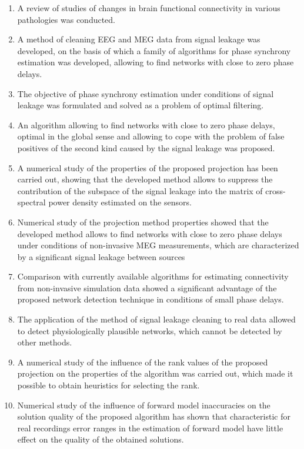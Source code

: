 \begin{enumerate}
  \item A review of studies of changes in brain functional connectivity in various pathologies was conducted.
  \item A method of cleaning EEG and MEG data from signal leakage was developed, on the basis of which a family of algorithms for phase synchrony estimation was developed, allowing to find networks with close to zero phase delays.
  \item The objective of phase synchrony estimation under conditions of signal leakage was formulated and solved as a problem of optimal filtering.
  \item An algorithm allowing to find networks with close to zero phase delays, optimal in the global sense and allowing to cope with the problem of false positives of the second kind caused by the signal leakage was proposed.
  \item A numerical study of the properties of the proposed projection has been carried out, showing that the developed method allows to suppress the contribution of the subspace of the signal leakage into the matrix of cross-spectral power density estimated on the sensors.
  \item Numerical study of the projection method properties showed that the developed method allows to find networks with close to zero phase delays under conditions of non-invasive MEG measurements, which are characterized by a significant signal leakage between sources
  \item Comparison with currently available algorithms for estimating connectivity  from non-invasive simulation data showed a significant advantage  of the proposed network detection technique in conditions of small phase delays.
  \item The application of the method of signal leakage cleaning to real data allowed to detect physiologically plausible networks, which cannot be detected by other methods.
  \item A numerical study of the influence of the rank values of the proposed projection on the properties of the algorithm was carried out, which made it possible to obtain heuristics for selecting the rank.
  \item Numerical study of the influence of forward model inaccuracies on the solution quality of the proposed algorithm has shown that characteristic for real recordings error ranges in the estimation of forward model have little effect on the quality of the obtained solutions.

\end{enumerate}
